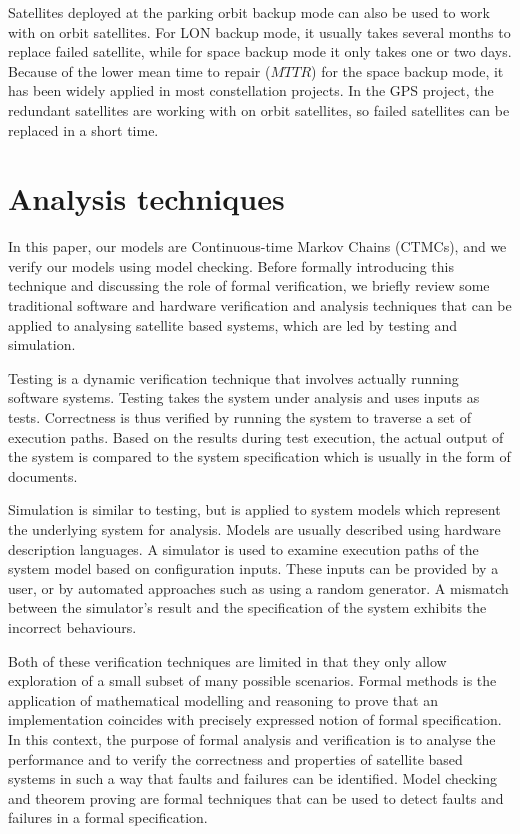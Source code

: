 \documentclass[preprint,12pt]{qrei}
\begin{document}
Satellites deployed at the parking orbit backup mode can also be used to work with on orbit satellites. For LON backup mode, it usually takes several months to replace failed satellite, while for space backup mode it only takes one or two days. Because of the lower mean time to repair ($MTTR$) for the space backup mode, it has been widely applied in most constellation projects. In the GPS project, the redundant satellites are working with on orbit satellites, so failed satellites can be replaced in a short time.



\section{Analysis techniques}\label{sect:formalmethods}

In this paper, our models are Continuous-time Markov Chains (CTMCs), and we verify our models using model checking. Before formally introducing this technique and discussing the role of formal verification, we briefly review some traditional software and hardware verification and analysis techniques that can be applied to analysing satellite based systems, which are led by testing and simulation.

Testing is a dynamic verification technique that involves actually running software systems. Testing takes the system under analysis and uses inputs as tests. Correctness is thus verified by running the system to traverse a set of execution paths. Based on the results during test execution, the actual output of the system is compared to the system specification which is usually in the form of documents.

Simulation is similar to testing, but is applied to system models which represent the underlying system for analysis. Models are usually described using hardware description languages. A simulator is used to examine execution paths of the system model based on configuration inputs. These inputs can be provided by a user, or by automated approaches such as using a random generator. A mismatch between the simulator's result and the specification of the system exhibits the incorrect behaviours.

Both of these verification techniques are limited in that they only allow exploration of a small subset of many possible scenarios. Formal methods is the application of mathematical modelling and reasoning to prove that an implementation coincides with precisely expressed notion of formal specification. In this context, the purpose of formal analysis and verification is to analyse the performance and to verify the correctness and properties of satellite based systems in such a way that faults and failures can be identified. Model checking and theorem proving are formal techniques that can be used to detect faults and failures in a formal specification.
\end{document}
